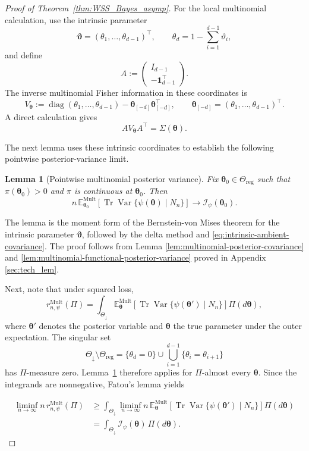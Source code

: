 \documentclass{article}
\newtheorem{lemma}[theorem]{Lemma}
\theoremstyle{named}
\theoremstyle{named1}
\newcommand{\E}{\mathbb{E}}
\newcommand{\Tr}{\operatorname{Tr}}
\newcommand{\Var}{\operatorname{Var}}
\newcommand{\diag}{\operatorname{diag}}
\newcommand{\Mult}{\mathrm{Mult}}
\newcommand{\btheta}{\boldsymbol{\theta}}
\newcommand{\bvartheta}{\boldsymbol{\vartheta}}
\newcommand{\bone}{\boldsymbol{1}}
\newcommand{\cI}{\mathcal{I}}
\theoremstyle{plain}
\theoremstyle{remark}
\begin{document}
\begin{proof}[Proof of Theorem~\ref{thm:WSS_Bayes_asymp}]
For the local multinomial calculation, use the intrinsic parameter
\[
    \bvartheta=(\theta_1,\ldots,\theta_{d-1})^\top,
    \qquad
    \theta_d=1-\sum_{i=1}^{d-1}\vartheta_i,
\]
and define
\[
    A:=
    \begin{pmatrix}
      I_{d-1}\\
      -\bone_{d-1}^\top
    \end{pmatrix}.
\]
The inverse multinomial Fisher information in these coordinates is
\[
    V_{\btheta}
    :=\diag(\theta_1,\ldots,\theta_{d-1})
      -\btheta_{[-d]}\btheta_{[-d]}^\top,
    \qquad
    \btheta_{[-d]}=(\theta_1,\ldots,\theta_{d-1})^\top.
\]
A direct calculation gives
\begin{equation}
    AV_{\btheta}A^\top=\Sigma(\btheta).
\label{eq:intrinsic-ambient-covariance}
\end{equation}

The next lemma uses these intrinsic coordinates to establish the
following pointwise posterior-variance limit.


\begin{lemma}[Pointwise multinomial posterior variance]
\label{lem:mult-pointwise}
Fix \(\btheta_0\in\Theta_{\mathrm{reg}}\) such that
\(\pi(\btheta_0)>0\) and \(\pi\) is continuous at \(\btheta_0\).
Then
\[
    n\,\E_{\btheta_0}^{\Mult}
    \left[\Tr\Var\{\psi(\btheta)\mid N_n\}\right]
    \rightarrow\cI_\psi(\btheta_0).
\]
\end{lemma}

The lemma is the moment form of the Bernstein-von Mises theorem for
the intrinsic parameter \(\bvartheta\), followed by the delta method
and \eqref{eq:intrinsic-ambient-covariance}. The proof  follows from Lemma \ref{lem:multinomial-posterior-covariance} and \ref{lem:multinomial-functional-posterior-variance} proved in Appendix \ref{sec:tech_lem}.


Next, note that under squared loss,
\[
    r_{n,\psi}^{\Mult}(\Pi)
    =\int_{\Theta_{\downarrow}}
      \E_{\btheta}^{\Mult}
      \left[\Tr\Var\{\psi(\btheta')\mid N_n\}\right]
      \Pi(d\btheta),
\]
where \(\btheta'\) denotes the posterior variable and \(\btheta\) the
true parameter under the outer expectation. The singular set
\[
    \Theta_{\downarrow}\setminus\Theta_{\mathrm{reg}}
    =\{\theta_d=0\}
      \cup\bigcup_{i=1}^{d-1}\{\theta_i=\theta_{i+1}\}
\]
has \(\Pi\)-measure zero. Lemma~\ref{lem:mult-pointwise} therefore
applies for \(\Pi\)-almost every \(\btheta\). Since the integrands are
nonnegative, Fatou's lemma yields

\begin{align}
\liminf_{n\to\infty}n\,r_{n,\psi}^{\Mult}(\Pi)
    &\geq
    \int_{\Theta_{\downarrow}}
      \liminf_{n\to\infty}
      n\,\E_{\btheta}^{\Mult}
      \left[\Tr\Var\{\psi(\btheta')\mid N_n\}\right]
      \Pi(d\btheta)\nonumber\\
    &=\int_{\Theta_{\downarrow}}
      \cI_\psi(\btheta)\,\Pi(d\btheta). \label{eq:mult_int_lower}
\end{align}




\end{proof}
\end{document}
